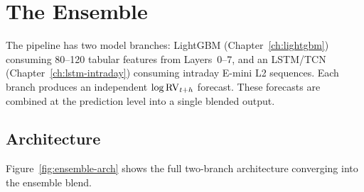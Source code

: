 \chapter{The Ensemble}
\label{ch:ensemble}

The pipeline has two model branches: LightGBM (Chapter~\ref{ch:lightgbm}) consuming 80--120 tabular features from Layers~0--7, and an LSTM/TCN (Chapter~\ref{ch:lstm-intraday}) consuming intraday E-mini L2 sequences.
Each branch produces an independent $\log \operatorname{RV}_{t+h}$ forecast.
These forecasts are combined at the prediction level into a single blended output.

\section{Architecture}
\label{sec:ensemble-arch}

Figure~\ref{fig:ensemble-arch} shows the full two-branch architecture converging into the ensemble blend.

